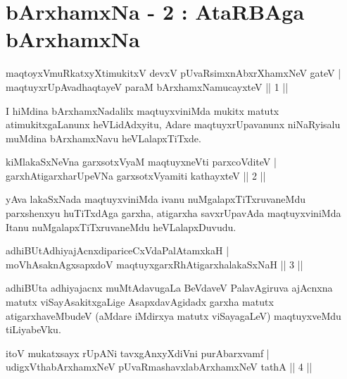 
\chapter{bArxhamxNa - 2 : AtaRBAga bArxhamxNa}


\begin{shl}
maqtoyxVmuRkatxyXtimukitxV devxV pUvaRsimxnAbxrXhamxNeV gateV |\\
maqtuyxrUpAvadhaqtayeV paraM bArxhamxNamucayxteV \hfill || 1 || 
\end{shl}	

\begin{artha}
I hiMdina bArxhamxNadalilx maqtuyxviniMda mukitx matutx atimukitxgaLanunx heVLidAdxyitu, Adare maqtuyxrUpavanunx niNaRyisalu muMdina bArxhamxNavu heVLalapxTiTxde.
\end{artha}

\begin{shl}
kiMlakaSxNeVna garxsotxV\s yaM maqtuyxneVti parxcoVditeV |\\
garxhAtigarxharUpeVNa garxsotxV\s yamiti kathayxteV \hfill || 2 || 
\end{shl}

\begin{artha}
yAva lakaSxNada maqtuyxviniMda ivanu nuMgalapxTiTxruvaneMdu parxshenxyu huTiTxdAga garxha, atigarxha savxrUpavAda maqtuyxviniMda Itanu nuMgalapxTiTxruvaneMdu heVLalapxDuvudu.
\end{artha}

\begin{shl}
adhiBUtAdhiyajAcnxdipariceCxVdaPalAtamxkaH |\\
moVhAsaknAgxsapxdoV maqtuyxgarxRhAtigarxhalakaSxNaH \hfill || 3 ||
\end{shl}

\begin{artha}
adhiBUta adhiyajacnx muMtAdavugaLa BeVdaveV PalavAgiruva ajAcnxna matutx viSayAsakitxgaLige AsapxdavAgidadx garxha matutx atigarxhaveMbudeV (aMdare iMdirxya matutx viSayagaLeV) maqtuyxveMdu tiLiyabeVku.
\end{artha}

\begin{shl}
itoV mukatxsayx rUpANi tavxgAnxyXdiVni purA\s barxvamf |\\
udigxVthabArxhamxNeV pUvaRmashavxlabArxhamxNeV tathA \hfill || 4 ||
\end{shl}

